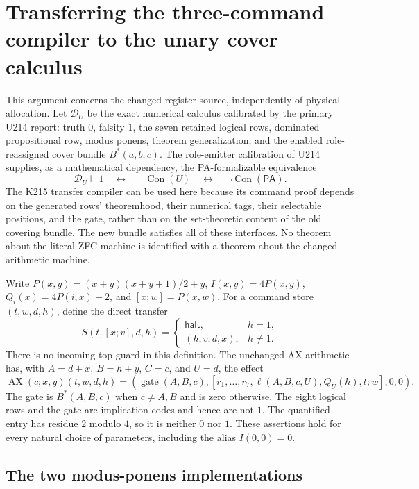 \section{Transferring the three-command compiler to the unary cover calculus}
\label{sec:transfer-u}

This argument concerns the changed register source, independently of physical
allocation.  Let $\mathcal D_U$ be the exact numerical calculus calibrated by
the primary U214 report: truth $0$, falsity $1$, the seven retained logical
rows, dominated propositional row, modus ponens, theorem generalization,
and the enabled role-reassigned cover bundle $B^*(a,b,c)$.  The role-emitter
calibration of U214 supplies, as a mathematical dependency, the
PA-formalizable equivalence
\[
 \mathcal D_U\vdash 1\quad\longleftrightarrow\quad
 \neg\operatorname{Con}(U)\quad\longleftrightarrow\quad
 \neg\operatorname{Con}(\mathsf{PA}).
\]
The K215 transfer compiler can be used here because its command proof depends
on the generated rows' theoremhood, their numerical tags, their selectable
positions, and the gate, rather than on the set-theoretic content of the
old covering bundle.  The new bundle satisfies all of these interfaces.
No theorem about the literal ZFC machine is identified with a theorem about
the changed arithmetic machine.

Write $P(x,y)=(x+y)(x+y+1)/2+y$, $I(x,y)=4P(x,y)$,
$Q_i(x)=4P(i,x)+2$, and $[x;w]=P(x,w)$.  For a command store
$(t,w,d,h)$, define the direct transfer
\[
 S(t,[x;v],d,h)=
 \begin{cases}\mathsf{halt},&h=1,\\(h,v,d,x),&h\ne1.\end{cases}
\]
There is no incoming-top guard in this definition.  The unchanged AX
arithmetic has, with $A=d+x$, $B=h+y$, $C=c$, and $U=d$, the effect
\[
 \operatorname{AX}(c;x,y)(t,w,d,h)=
 (\operatorname{gate}(A,B,c),
 [r_1,\ldots,r_7,\ell(A,B,c,U),Q_U(h),t;w],0,0).
\]
The gate is $B^*(A,B,c)$ when $c\ne A,B$ and is zero otherwise.
The eight logical rows and the gate are implication codes and hence are
not $1$.  The quantified entry has residue $2$ modulo $4$, so it is
neither $0$ nor $1$.  These assertions hold for every natural choice of
parameters, including the alias $I(0,0)=0$.

\subsection{The two modus-ponens implementations}

